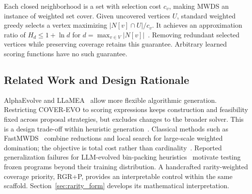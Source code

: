 Each closed neighborhood is a set with selection cost $c_v$, making MWDS
an instance of weighted set cover. Given uncovered vertices $U$, standard
weighted greedy selects a vertex maximizing $|N[v]\cap U|/c_v$.
It achieves an approximation ratio of $H_d\leq 1+\ln d$ for
$d=\max_{v\in V}|N[v]|$~\cite{chvatal}. Removing redundant selected
vertices while preserving coverage retains this guarantee. Arbitrary
learned scoring functions have no such guarantee.

\subsection{Related Work and Design Rationale}

AlphaEvolve and LLaMEA~\cite{alphaevolve,llamea} allow more flexible
algorithmic generation. Restricting COVER-EVO to scoring expressions
keeps construction and feasibility fixed across proposal strategies,
but excludes changes to the broader solver. This is a design trade-off
within heuristic generation~\cite{burke}.
Classical methods such as FastMWDS~\cite{fastmwds} combine reductions
and local search for large-scale weighted domination; the objective is
total cost rather than cardinality~\cite{weighted}.
Reported generalization failures for LLM-evolved bin-packing
heuristics~\cite{sim2025} motivate testing frozen programs beyond their
training distribution. A handcrafted rarity-weighted coverage priority,
RGR+P, provides an interpretable control within the same scaffold.
Section~\ref{sec:rarity_form} develops its mathematical interpretation.
